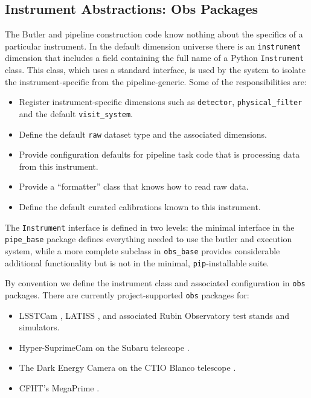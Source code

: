\subsection{Instrument Abstractions: Obs Packages}
\label{sec:obs_packages}

The Butler and pipeline construction code know nothing about the specifics of a particular instrument.
In the default dimension universe there is an \texttt{instrument} dimension that includes a field containing the full name of a Python \texttt{Instrument} class.
This class, which uses a standard interface, is used by the system to isolate the instrument-specific from the pipeline-generic.
Some of the responsibilities are:

\begin{itemize}
\item Register instrument-specific dimensions such as \texttt{detector}, \texttt{physical\_filter} and the default \texttt{visit\_system}.
\item Define the default \texttt{raw} dataset type and the associated dimensions.
\item Provide configuration defaults for pipeline task code that is processing data from this instrument.
\item Provide a ``formatter'' class that knows how to read raw data.
\item Define the default curated calibrations known to this instrument.
\end{itemize}

The \texttt{Instrument} interface is defined in two levels: the minimal interface in the \texttt{pipe\_base} package defines everything needed to use the butler and execution system, while a more complete subclass in \texttt{obs\_base} provides considerable additional functionality but is not in the minimal, \texttt{pip}-installable suite.

By convention we define the instrument class and associated configuration in \texttt{obs} packages.
There are currently project-supported \texttt{obs} packages for:

\begin{itemize}
\item LSSTCam \citep{2024SPIE13096E..1SR,2024SPIE13096E..1OL, 2024SPIE13103E..0WU,2010SPIE.7735E..0JK}, LATISS \citep{2020SPIE11452E..0UI}, and associated Rubin Observatory test stands and simulators.
\item Hyper-SuprimeCam on the Subaru telescope \citep{2018PASJ...70S...1M}.
\item The Dark Energy Camera on the CTIO Blanco telescope \citep{2015AJ....150..150F,2008SPIE.7014E..0ED}.
\item CFHT's MegaPrime \citep{2003SPIE.4841...72B}.
\end{itemize}

